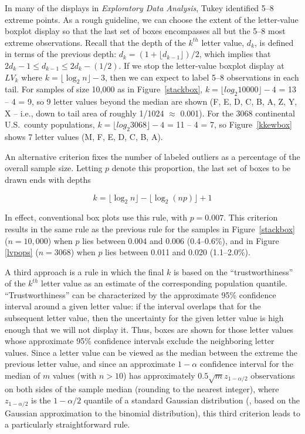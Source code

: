\documentclass[oneside]{article}
\begin{document}
In many of the displays in \textit{Exploratory Data Analysis}, Tukey identified 5--8 extreme points. As a rough guideline, we can choose the extent of the letter-value boxplot display so that the last set of boxes encompasses all but the 5--8 most extreme observations. Recall that the depth of the $k^{th}$ letter value, $d_k$, is defined in terms of the previous depth: $d_k = (1 + \lfloor d_{k-1} \rfloor)/2$, which implies that $2 d_{k} -1 \leq d_{k-1} \leq 2 d_k - (1/2)$. If we stop the letter-value boxplot display at $LV_k$ where $k = \lfloor \log_2 n \rfloor - 3$, then we can expect to label 5--8 observations in each tail. For samples of size 10,000 as in Figure~\ref{stackbox}, $k = \lfloor log_2 10000 \rfloor - 4$ = 13 -- 4 = 9, so 9 letter values beyond the median are shown (F, E, D, C, B, A, Z, Y, X -- i.e., down to tail area of roughly 1/1024 $\approx$ 0.001). For the 3068 continental U.S.\ county populations, $k = \lfloor log_2 3068 \rfloor - 4$ = 11 -- 4 = 7, so Figure~\ref{kkewbox} shows 7 letter values (M, F, E, D, C, B, A).

An alternative criterion fixes the number of labeled outliers as a percentage of the overall sample size. Letting $p$ denote this proportion, the last set of boxes to be drawn ends with depths

\begin{equation}
k = \lfloor \log_2 n \rfloor - \lfloor \log_2 (np) \rfloor + 1
\end{equation}

\noindent In effect, conventional box plots use this rule, with $p = 0.007$. This criterion results in the same rule as the previous rule for the samples in Figure~\ref{stackbox} ($n = 10,000$) when $p$ lies between 0.004 and 0.006 (0.4--0.6\%), and in Figure \ref{lvpops} ($n = 3068$) when $p$ lies between 0.011 and 0.020 (1.1--2.0\%).

A third approach is a rule in which the final $k$ is based on the ``trustworthiness'' of the $k^{th}$ letter value as an estimate of the corresponding population quantile. ``Trustworthiness'' can be characterized by the approximate 95\% confidence interval around a given letter value: if the interval overlaps that for the subsequent letter value, then the uncertainty for the given letter value is high enough that we will not display it. Thus, boxes are shown for those letter values whose approximate 95\% confidence intervals exclude the neighboring letter values. Since a letter value can be viewed as the median between the extreme the previous letter value, and since an approximate $1-\alpha$ confidence interval for the median of $m$ values (with $n > 10$) has approximately $0.5 \sqrt{m} z_{1-\alpha/2}$ observations on both sides of the sample median (rounding to the nearest integer), where $z_{1-\alpha/2}$ is the ${1-\alpha/2}$ quantile of a standard Gaussian distribution (\citet[161]{ha.order}, based on the Gaussian approximation to the binomial distribution), this third criterion leads to a particularly straightforward rule.
\end{document}
